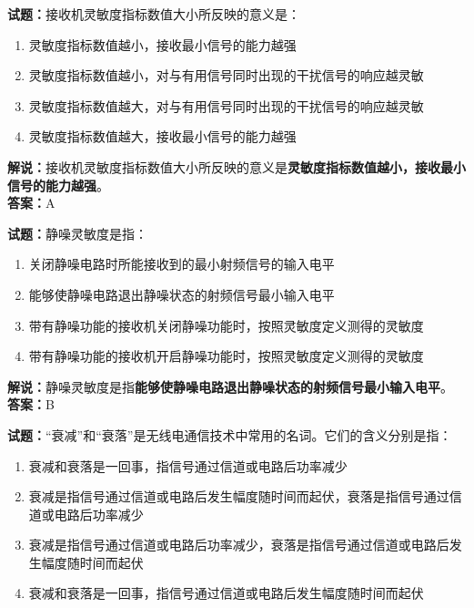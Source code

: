 \documentclass{ctexbook}
\begin{document}
\bigskip

\noindent\textbf{试题：}接收机灵敏度指标数值大小所反映的意义是：

\begin{enumerate}[leftmargin=3em]
  \item 灵敏度指标数值越小，接收最小信号的能力越强
  \item 灵敏度指标数值越小，对与有用信号同时出现的干扰信号的响应越灵敏
  \item 灵敏度指标数值越大，对与有用信号同时出现的干扰信号的响应越灵敏
  \item 灵敏度指标数值越大，接收最小信号的能力越强
\end{enumerate}

\noindent\textbf{解说：}接收机灵敏度指标数值大小所反映的意义是\textbf{灵敏度指标数值越小，接收最小信号的能力越强}。\\\noindent\textbf{答案：}A%

\bigskip

\noindent\textbf{试题：}静噪灵敏度是指：

\begin{enumerate}[leftmargin=3em]
  \item 关闭静噪电路时所能接收到的最小射频信号的输入电平
  \item 能够使静噪电路退出静噪状态的射频信号最小输入电平
  \item 带有静噪功能的接收机关闭静噪功能时，按照灵敏度定义测得的灵敏度
  \item 带有静噪功能的接收机开启静噪功能时，按照灵敏度定义测得的灵敏度
\end{enumerate}

\noindent\textbf{解说：}静噪灵敏度是指\textbf{能够使静噪电路退出静噪状态的射频信号最小输入电平}。\\\noindent\textbf{答案：}B%

\bigskip

\noindent\textbf{试题：}“衰减”和“衰落”是无线电通信技术中常用的名词。它们的含义分别是指：

\begin{enumerate}[leftmargin=3em]
  \item 衰减和衰落是一回事，指信号通过信道或电路后功率减少
  \item 衰减是指信号通过信道或电路后发生幅度随时间而起伏，衰落是指信号通过信道或电路后功率减少
  \item 衰减是指信号通过信道或电路后功率减少，衰落是指信号通过信道或电路后发生幅度随时间而起伏
  \item 衰减和衰落是一回事，指信号通过信道或电路后发生幅度随时间而起伏
\end{enumerate}
\end{document}
